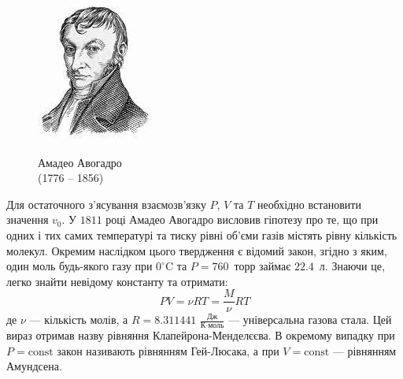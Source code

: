 \begin{figure}
\includegraphics[width=\linewidth]{Lec1/Avogadro}
\caption*{Амадео Авогадро\\(1776 -- 1856)}
\end{figure}
Для остаточного з’ясування  взаємозв’язку $P$, $V$ та $T$ необхідно  встановити значення $v_0$. У $1811$ році Амадео Авогадро висловив гіпотезу про те, що при одних і тих самих температурі та тиску рівні об'єми газів містять рівну кількість молекул. Окремим наслідком цього твердження є відомий закон, згідно з яким, один моль будь-якого газу при $0^\circ$C та $P=760$~торр займає $22.4$~л. Знаючи це, легко знайти невідому константу та отримати:
\begin{equation}
    PV = \nu RT = \frac{M}{\nu} RT
\end{equation}
де $\nu$ --- кількість молів, а $ R= 8.311441$ $\frac{\text{Дж}}{\text{К}\cdot\text{моль}}$ --- універсальна газова стала. Цей вираз отримав назву рівняння Клапейрона-Менделєєва. В окремому випадку при $P=\mathrm{const}$ закон називають рівнянням Гей-Люсака, а при $V=\mathrm{const}$ --- рівнянням Амундсена.





